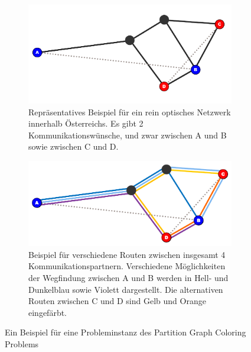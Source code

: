 \begin{figure}
	\centering
	\begin{subfigure}{\textwidth}
		\includegraphics{img/bsp1}
		\caption{Repräsentatives Beispiel für ein rein optisches Netzwerk innerhalb Österreichs. Es gibt 2 Kommunikationswünsche, und zwar zwischen A und B sowie zwischen C und D.}
		\label{fig:example:a}
	\end{subfigure}
	\begin{subfigure}{\textwidth}
		\includegraphics{img/bsp2}
		\caption{Beispiel für verschiedene Routen zwischen insgesamt 4 Kommunikationspartnern. Verschiedene Möglichkeiten der Wegfindung zwischen A und B werden in Hell- und Dunkelblau sowie Violett dargestellt. Die alternativen Routen zwischen C und D sind Gelb und Orange eingefärbt.}
		\label{fig:example:b}
	\end{subfigure}
	\caption{Ein Beispiel für eine Probleminstanz des Partition Graph Coloring Problems}
	\label{fix:example}
\end{figure}

